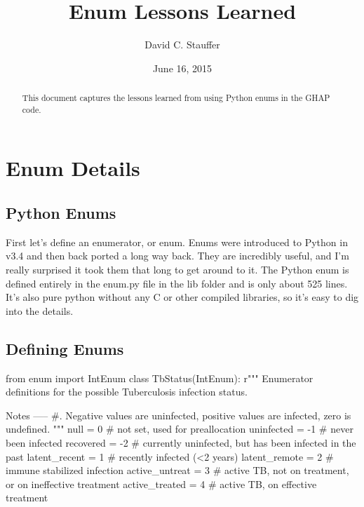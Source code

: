 \documentclass[12pt]{article}
\begin{document}
\title{Enum Lessons Learned}
\author{David C. Stauffer}
\date{June 16, 2015}
\maketitle

\begin{abstract}\label{Abstract}
This document captures the lessons learned from using Python enums in the GHAP code.
\end{abstract}

\begin{versionhistory}
\end{versionhistory}

\pagebreak
\section{Enum Details}\label{h1:Enum_details}
\subsection{Python Enums}\label{h2:Python_enums}
First let's define an enumerator, or enum.  Enums were introduced to Python in v3.4 and then back ported a long way back.  They are incredibly useful, and I'm really surprised it took them that long to get around to it.  The Python enum is defined entirely in the enum.py file in the lib folder and is only about 525 lines.  It's also pure python without any C or other compiled libraries, so it's easy to dig into the details.

\subsection{Defining Enums}\label{h2:Defining_enums}
\begin{Python}
from enum import IntEnum
class TbStatus(IntEnum):
    r"""
    Enumerator definitions for the possible Tuberculosis infection status.

    Notes
    -----
    #.  Negative values are uninfected, positive values are infected, zero
        is undefined.
    """
    null           =  0 # not set, used for preallocation
    uninfected     = -1 # never been infected
    recovered      = -2 # currently uninfected, but has been infected in the past
    latent_recent  =  1 # recently infected (<2 years)
    latent_remote  =  2 # immune stabilized infection
    active_untreat =  3 # active TB, not on treatment, or on ineffective treatment
    active_treated =  4 # active TB, on effective treatment
\end{Python}
\end{document}
